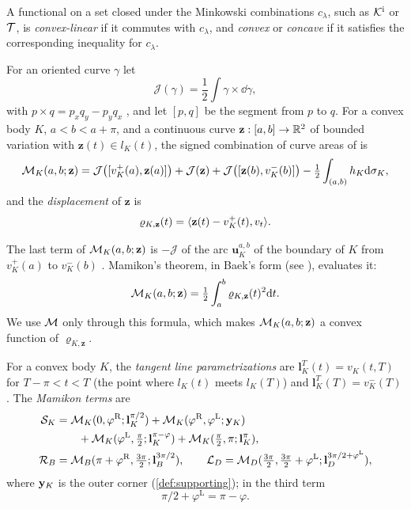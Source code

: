 \begin{definition}\label{def:convexlinear}
A functional on a set closed under the Minkowski combinations $c_\lambda$, such
as $\mathcal{K}^{\mathrm{i}}$ or $\mathcal{T}$, is \emph{convex-linear} if it commutes with $c_\lambda$, and
\emph{convex} or \emph{concave} if it satisfies the corresponding inequality for
$c_\lambda$.
\end{definition}

\begin{definition}\label{def:curve-areas}
For an oriented curve $\gamma$ let
\[
  \mathcal J(\gamma)=\frac12\int\gamma\times\dd\gamma,
\]
with $p\times q=p_xq_y-p_yq_x$ , and let $[p,q]$ be
the segment from $p$ to $q$. For a convex body $K$, $a<b<a+\pi$, and a
continuous curve $\mathbf z:[a,b]\to\mathbb{R}^2$ of bounded variation with $\mathbf
z(t)\in l_K(t)$, the signed combination of curve areas of  is
\[
  \mathcal{M}_K(a,b;\mathbf z)=\mathcal J\bigl([v_K^+(a),\mathbf z(a)]\bigr)
    +\mathcal J(\mathbf z)+\mathcal J\bigl([\mathbf z(b),v_K^-(b)]\bigr)
  -\tfrac12\int_{(a,b)}h_K\mathrm{d}\sigma_K,
\]
and the \emph{displacement} of $\mathbf z$ is
\[
  \varrho_{K,\mathbf z}(t)=\langle \mathbf z(t)-v_K^+(t),v_t\rangle.
\]
\end{definition}

The last term of $\mathcal{M}_K(a,b;\mathbf z)$ is $-\mathcal J$ of the arc $\mathbf
u_K^{a,b}$ of the boundary of $K$ from $v_K^+(a)$ to $v_K^-(b)$
. Mamikon's theorem, in Baek's form
 (see \cite{Mnatsakanian97}), evaluates it:
\[
  \mathcal{M}_K(a,b;\mathbf z)=\tfrac12\int_a^b\varrho_{K,\mathbf z}(t)^2\mathrm{d} t .
\]
We use $\mathcal{M}$ only through this formula, which makes $\mathcal{M}_K(a,b;\mathbf z)$ a
convex function of $\varrho_{K,\mathbf z}$.

\begin{definition}\label{def:mamikon}
For a convex body $K$, the \emph{tangent line parametrizations} are $\mathbf
l_K^T(t)=v_K(t,T)$ for $T-\pi<t<T$ (the point where $l_K(t)$ meets $l_K(T)$)
and $\mathbf l_K^T(T)=v_K^-(T)$. The \emph{Mamikon terms} are
\begin{align*}
  \mathcal{S}_K&=\mathcal{M}_K(0,\varphi^{\mathrm R};\mathbf l_K^{\pi/2})
    +\mathcal{M}_K(\varphi^{\mathrm R},\varphi^{\mathrm L};\mathbf{y}_K)\\
  &\qquad+\mathcal{M}_K(\varphi^{\mathrm L},\tfrac\pi2;\mathbf l_K^{\pi-\varphi})
    +\mathcal{M}_K(\tfrac\pi2,\pi;\mathbf l_K^{\pi}),\\
  \mathcal{R}_B&=\mathcal{M}_B(\pi+\varphi^{\mathrm R},\tfrac{3\pi}2;\mathbf l_B^{3\pi/2}),
    \qquad
  \mathcal{L}_D=\mathcal{M}_D(\tfrac{3\pi}2,\tfrac{3\pi}2
    +\varphi^{\mathrm L};\mathbf l_D^{3\pi/2+\varphi^{\mathrm L}}),
\end{align*}
where $\mathbf{y}_K$ is the outer corner (\cref{def:supporting}); in the third term
\[
  \pi/2+\varphi^{\mathrm L}=\pi-\varphi.
\]
\end{definition}

